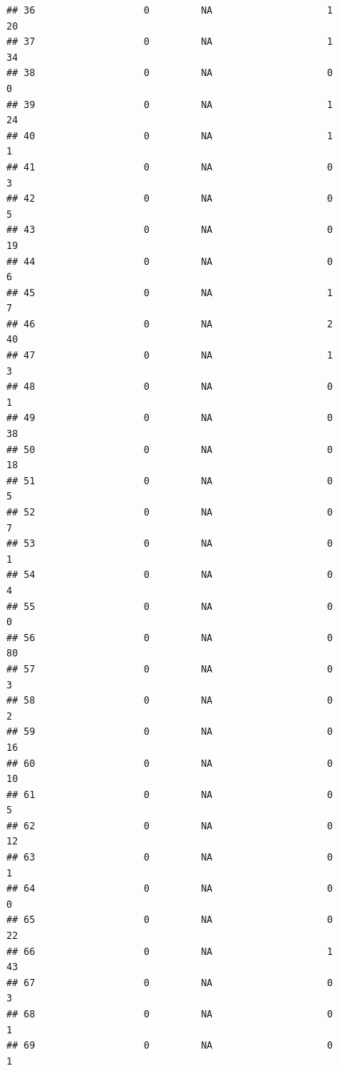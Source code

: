 \documentclass[
]{article}
\begin{document}
\begin{verbatim}
## 36                   0         NA                    1                 20
## 37                   0         NA                    1                 34
## 38                   0         NA                    0                  0
## 39                   0         NA                    1                 24
## 40                   0         NA                    1                  1
## 41                   0         NA                    0                  3
## 42                   0         NA                    0                  5
## 43                   0         NA                    0                 19
## 44                   0         NA                    0                  6
## 45                   0         NA                    1                  7
## 46                   0         NA                    2                 40
## 47                   0         NA                    1                  3
## 48                   0         NA                    0                  1
## 49                   0         NA                    0                 38
## 50                   0         NA                    0                 18
## 51                   0         NA                    0                  5
## 52                   0         NA                    0                  7
## 53                   0         NA                    0                  1
## 54                   0         NA                    0                  4
## 55                   0         NA                    0                  0
## 56                   0         NA                    0                 80
## 57                   0         NA                    0                  3
## 58                   0         NA                    0                  2
## 59                   0         NA                    0                 16
## 60                   0         NA                    0                 10
## 61                   0         NA                    0                  5
## 62                   0         NA                    0                 12
## 63                   0         NA                    0                  1
## 64                   0         NA                    0                  0
## 65                   0         NA                    0                 22
## 66                   0         NA                    1                 43
## 67                   0         NA                    0                  3
## 68                   0         NA                    0                  1
## 69                   0         NA                    0                  1

\end{verbatim}
\end{document}
